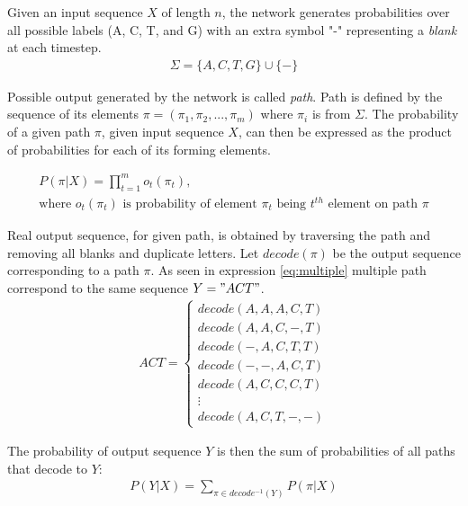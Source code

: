 \documentclass[times, utf8, diplomski, numeric, english]{fer}
\begin{document}
Given an input sequence $X$ of length $n$, the network generates probabilities over all possible labels (A, C, T, and G) with an extra symbol "-" representing a \textit{blank} at each timestep. 
\begin{equation}
\begin{gathered}
\Sigma = \{A, C, T, G\} \cup \{-\}
\end{gathered}
\end{equation}


Possible output generated by the network is called \textit{path}. Path is defined by the sequence of its elements $\pi = (\pi_1, \pi_2, ..., \pi_m)$ where $\pi_i$ is from $\Sigma$.
The probability of a given path $\pi$, given input sequence $X$, can then be expressed as the product of probabilities for each of its forming elements.

\begin{equation}
\begin{gathered}
P(\pi | X) = \prod_{t=1}^{m} o_t(\pi_t), \\
\text{where $o_t(\pi_t)$ is probability of element $\pi_t$ being $t^{th}$ element on path $\pi$}
\end{gathered}
\end{equation}


Real output sequence, for given path, is obtained by traversing the path and removing all blanks and duplicate letters. Let $ decode(\pi) $ be the output sequence corresponding to a path $\pi$. As seen
in expression \ref{eq:multiple} multiple path correspond to the same sequence $Y="ACT"$.
\begin{equation}
\begin{gathered}
\label{eq:multiple}
ACT = \begin{cases}
decode(A, A, A, C, T) \\
decode(A, A, C, -, T) \\
decode(-, A, C, T, T)  \\
decode(-, -, A, C, T)  \\
decode(A, C, C, C, T)  \\
\vdots \\
decode(A, C, T, -, -) 
\end{cases}
\end{gathered}
\end{equation}

The probability of output sequence $Y$ is then the sum of probabilities of all paths that decode to $Y$:
\begin{equation}
\begin{gathered}
P(Y | X) = \sum_{\pi \in decode^{-1}(Y)}^{} P(\pi | X)
\end{gathered}
\end{equation}
\end{document}
